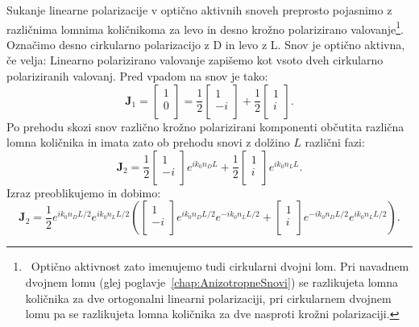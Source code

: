 Sukanje linearne polarizacije v optično aktivnih snoveh preprosto pojasnimo
z različnima lomnima količnikoma za levo in desno krožno polarizirano valovanje\footnote{~Optično 
aktivnost zato imenujemo tudi cirkularni dvojni lom. Pri navadnem dvojnem lomu 
(glej poglavje~\ref{chap:AnizotropneSnovi}) se razlikujeta lomna količnika za dve 
ortogonalni linearni polarizaciji, pri cirkularnem dvojnem lomu pa se razlikujeta lomna
količnika za dve nasproti krožni polarizaciji.}.
Označimo desno cirkularno polarizacijo z D in levo z L. Snov je optično aktivna, če velja:
Linearno polarizirano valovanje zapišemo kot vsoto dveh cirkularno polariziranih
valovanj. Pred vpadom na snov je tako:
\begin{equation}
\mathbf{J}_{1} = 
\left[\begin{array}{c}
1\\
0\\
\end{array}\right] = 
\frac{1}{2}
\left[\begin{array}{c}
1\\
-i\\
\end{array}\right]
+ 
\frac{1}{2}
\left[\begin{array}{c}
1\\
i\\
\end{array}\right]\!\!.
\label{eq:09_43}
\end{equation}
Po prehodu skozi snov različno krožno polarizirani komponenti 
občutita različna lomna količnika in imata zato ob prehodu snovi z 
dolžino $L$ različni fazi:
\begin{equation}
\mathbf{J}_{2}  = 
\frac{1}{2}
\left[\begin{array}{c}
1\\
-i\\
\end{array}\right]e^{ik_0n_D L}
+ 
\frac{1}{2}
\left[\begin{array}{c}
1\\
i\\
\end{array}\right]e^{ik_0n_L L}.
\label{eq:09_44}
\end{equation}
Izraz preoblikujemo in dobimo:
\begin{equation}
\mathbf{J}_{2}  = \frac{1}{2} e^{ik_0n_D L/2}e^{ik_0n_L L/2}
\left(
\left[\begin{array}{c}
1\\
-i\\
\end{array}\right]e^{ik_0n_D L/2} e^{-ik_0n_L L/2}+
\left[\begin{array}{c}
1\\
i\\
\end{array}\right]e^{-ik_0n_D L/2} e^{ik_0n_L L/2}
\right)\!\!.
\label{eq:09_45}
\end{equation}
